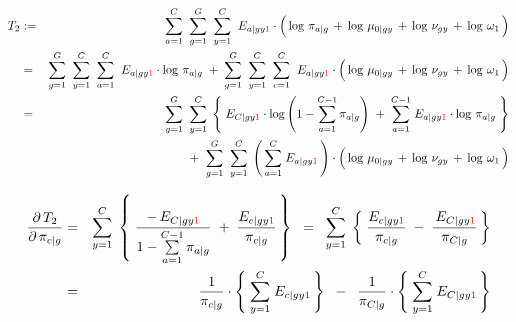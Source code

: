 \begin{eqnarray*}
T_{2}
&:=&
	\overset{C}{\underset{a=1}{\sum}}\;\;
	\overset{G}{\underset{g=1}{\sum}}\;\;
	\overset{C}{\underset{y=1}{\sum}}\;\;
	E_{a \vert gy{\color{red}1}}
	\cdot
	\left(\,
		\log\,\pi_{a \vert g}
		\,\overset{{\color{white}.}}{+}\,
		\log\,\mu_{0\vert gy}
		\,\overset{{\color{white}.}}{+}\,
		\log\,\nu_{gy}
		\,\overset{{\color{white}.}}{+}\,
		\log\,\omega_{1}
	\,\right)
\\
&=&
	\overset{G}{\underset{g=1}{\sum}}\;\;
	\overset{C}{\underset{y=1}{\sum}}\;\;
	\overset{C}{\underset{a=1}{\sum}}\;\;
	E_{a \vert gy{\color{red}1}} \cdot \log\,\pi_{a \vert g}
	\; + \;
	\overset{G}{\underset{g=1}{\sum}}\;\;
	\overset{C}{\underset{y=1}{\sum}}\;\;
	\overset{C}{\underset{c=1}{\sum}}\;\;
	E_{a \vert gy{\color{red}1}}
	\cdot
	\left(\,
		\log\,\mu_{0\vert gy}
		\,\overset{{\color{white}.}}{+}\,
		\log\,\nu_{gy}
		\,\overset{{\color{white}.}}{+}\,
		\log\,\omega_{1}
	\,\right)
\\
&=&
	{\color{white}+} \;\;
	\overset{G}{\underset{g=1}{\sum}}\;\;
	\overset{C}{\underset{y=1}{\sum}}\;
	\left\{\;
		E_{C \vert gy{\color{red}1}} \cdot \log\left(1 - \overset{C-1}{\underset{a=1}{\sum}}\,\pi_{a \vert g}\right)
		\; + \;
		\overset{C-1}{\underset{a=1}{\sum}}\;
		E_{a \vert gy{\color{red}1}} \cdot \log\,\pi_{a \vert g}
	\;\right\}
\\
&&
	+ \;\;
	\overset{G}{\underset{g=1}{\sum}}\;\;
	\overset{C}{\underset{y=1}{\sum}}\;
	\left(\,\overset{C}{\underset{a=1}{\sum}}\; E_{a \vert gy{\color{red}1}}\,\right)
	\cdot
	\left(\,
		\log\,\mu_{0\vert gy}
		\,\overset{{\color{white}.}}{+}\,
		\log\,\nu_{gy}
		\,\overset{{\color{white}.}}{+}\,
		\log\,\omega_{1}
	\,\right)
\end{eqnarray*}

\begin{eqnarray*}
\dfrac{\partial\,T_{2}}{\partial\,\pi_{c \vert g}}
&=&
	\overset{C}{\underset{y=1}{\sum}}\;
	\left\{\;
		\dfrac{-\,E_{C \vert gy{\color{red}1}}}{1 - \overset{C-1}{\underset{a=1}{\sum}}\,\pi_{a \vert g}}
		\; + \;
		\dfrac{E_{c \vert gy{\color{red}1}}}{\pi_{c \vert g}}
	\,\right\}
	\;\; = \;\;
	\overset{C}{\underset{y=1}{\sum}}\;
	\left\{\;
		\dfrac{E_{c \vert gy{\color{red}1}}}{\pi_{c \vert g}}
		\; - \;
		\dfrac{\,E_{C \vert gy{\color{red}1}}}{\pi_{C \vert g}}
	\,\right\}
\\
&=&
	\dfrac{1}{\pi_{c \vert g}}
	\cdot
	\left\{\;
		\overset{C}{\underset{y=1}{\sum}}\;
		E_{c \vert gy{\color{red}1}}
	\,\right\}
	\;\; - \;\;
	\dfrac{1}{\pi_{C \vert g}}
	\cdot
	\left\{\;
		\overset{C}{\underset{y=1}{\sum}}\;
		E_{C \vert gy{\color{red}1}}
	\,\right\}
\end{eqnarray*}

